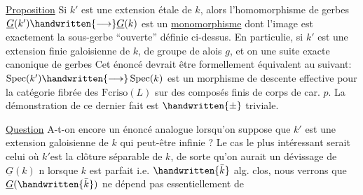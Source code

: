 \uline{Proposition}  Si $k'$ est une extension  étale de $k$, alors l'homomorphisme de gerbes $\underline{G}(k')\handwritten{\longrightarrow}\underline{G}(k)$ est un \uline{monomorphisme} dont l'image est exactement la sous-gerbe ``ouverte'' définie ci-dessus. En particulie, si $k'$ est une extension finie galoisienne de $k$,  de groupe de alois $g$, et on une suite exacte canonique de gerbes
Cet énoncé devrait être formellement équivalent au suivant: $\operatorname{Spec}(k')\handwritten{\longrightarrow}\operatorname{Spec}(k)$ est un morphisme de descente effective pour la catégorie fibrée des $\mathrm{Fcriso}(L)$ sur des composés finis de corps de car. $p$. La démonstration de ce dernier fait est $\handwritten{\pm}$ triviale.

\uline{Question}  A-t-on encore un énoncé analogue lorsqu'on suppose que $k'$ est une extension galoisienne de $k$ qui peut-être infinie ? Le cas le plus intéressant serait celui où $k'$est la clôture séparable de $k$, de sorte qu'on aurait un dévissage de $\underline{G}(k)$ n
lorsque $k$ est parfait i.e. $\handwritten{\bar{k}}$ alg. clos, nous verrons que $\underline{G}(\handwritten{\bar{k}})$ ne dépend pas essentiellement de 


